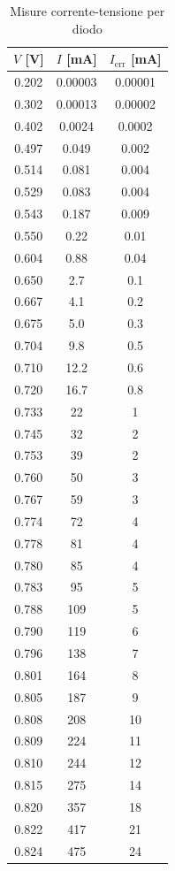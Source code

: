 \documentclass[letterpaper,12pt]{article}
\begin{document}
\begin{table}[htbp]
\centering
{} %
\begin{tabular}{ccc}
    \toprule
    \textbf{$V$ [V]} & \textbf{$I$ [mA]} & \textbf{$I_{\text{err}}$ [mA]} \\
    \midrule
    0.202 & 0.00003 & 0.00001 \\
    0.302 & 0.00013 & 0.00002 \\
    0.402 & 0.0024 & 0.0002 \\
    0.497 & 0.049 & 0.002 \\
    0.514 & 0.081 & 0.004 \\
    0.529 & 0.083 & 0.004 \\
    0.543 & 0.187 & 0.009 \\
    0.550 & 0.22 & 0.01 \\
    0.604 & 0.88 & 0.04 \\
    0.650 & 2.7 & 0.1 \\
    0.667 & 4.1 & 0.2 \\
    0.675 & 5.0 & 0.3 \\
    0.704 & 9.8 & 0.5 \\
    0.710 & 12.2 & 0.6 \\
    0.720 & 16.7 & 0.8 \\
    0.733 & 22 & 1 \\
    0.745 & 32 & 2 \\
    0.753 & 39 & 2 \\
    0.760 & 50 & 3 \\
    0.767 & 59 & 3 \\
    0.774 & 72 & 4 \\
    0.778 & 81 & 4 \\
    0.780 & 85 & 4 \\
    0.783 & 95 & 5 \\
    0.788 & 109 & 5 \\
    0.790 & 119 & 6 \\
    0.796 & 138 & 7 \\
    0.801 & 164 & 8 \\
    0.805 & 187 & 9 \\
    0.808 & 208 & 10 \\
    0.809 & 224 & 11 \\
    0.810 & 244 & 12 \\
    0.815 & 275 & 14 \\
    0.820 & 357 & 18 \\
    0.822 & 417 & 21 \\
    0.824 & 475 & 24 \\
    \bottomrule
\end{tabular}
\caption{Misure corrente-tensione per diodo}
\label{tab:Misure diodo}
\end{table}
\end{document}
